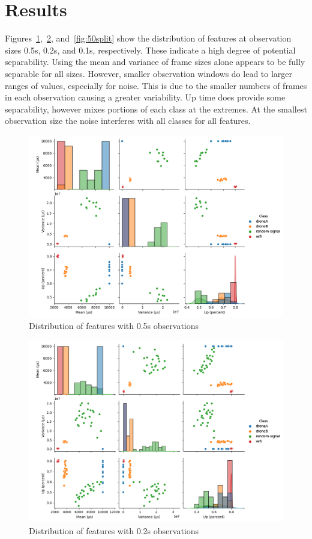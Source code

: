 \documentclass[12pt]{article}
\begin{document}
\section{Results}

Figures~\ref{fig:10split},~\ref{fig:25split}, and~\ref{fig:50split} show the distribution of features at observation sizes 0.5s, 0.2s, and 0.1s, respectively. These indicate a high degree of potential separability. Using the mean and variance of frame sizes alone appears to be fully separable for all sizes. However, smaller observation windows do lead to larger ranges of values, especially for noise. This is due to the smaller numbers of frames in each observation causing a greater variability. Up time does provide some separability, however mixes portions of each class at the extremes. At the smallest observation size the noise interferes with all classes for all features.

\begin{figure}[H]
	\includegraphics[width=\linewidth]{img/feature_facets_10_splits.png}
	\caption{Distribution of features with 0.5s observations}
	\label{fig:10split}
\end{figure}

\begin{figure}[H]
	\includegraphics[width=\linewidth]{img/feature_facets_25_splits.png}
	\caption{Distribution of features with 0.2s observations}
	\label{fig:25split}
\end{figure}
\end{document}
